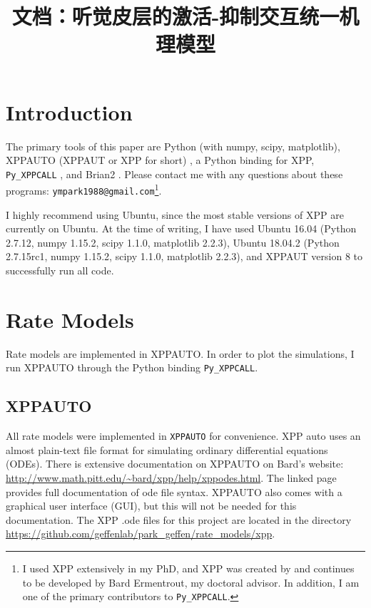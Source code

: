 \documentclass[a4paper,10pt]{article}
\title{文档：听觉皮层的激活-抑制交互统一机理模型}
\newcommand{\y}[1]{{\texttt{#1}}}
\begin{document}
\maketitle



\section{Introduction}
The primary tools of this paper are Python (with numpy, scipy, matplotlib), XPPAUTO (XPPAUT or XPP for short) \cite{ermentrout2002simulating}, a Python binding for XPP, \y{Py\_XPPCALL} \cite{xppy}, and Brian2 \cite{Stimberg595710}. Please contact me with any questions about these programs: \y{ympark1988@gmail.com}\footnote{I used XPP extensively in my PhD, and XPP was created by and continues to be developed by Bard Ermentrout, my doctoral advisor. In addition, I am one of the primary contributors to \y{Py\_XPPCALL}.}.

I highly recommend using Ubuntu, since the most stable versions of XPP are currently on Ubuntu. At the time of writing, I have used Ubuntu 16.04 (Python 2.7.12, numpy 1.15.2, scipy 1.1.0, matplotlib 2.2.3), Ubuntu 18.04.2 (Python 2.7.15rc1, numpy 1.15.2, scipy 1.1.0, matplotlib 2.2.3), and XPPAUT version 8 to successfully run all code.

\section{Rate Models}

Rate models are implemented in XPPAUTO. In order to plot the simulations, I run XPPAUTO through the Python binding \y{Py\_XPPCALL}. 

\subsection{XPPAUTO}
All rate models were implemented in \texttt{XPPAUTO} for convenience. XPP auto uses an almost plain-text file format for simulating ordinary differential equations (ODEs). There is extensive documentation on XPPAUTO on Bard's website:
\url{http://www.math.pitt.edu/~bard/xpp/help/xppodes.html}. The linked page provides full documentation of ode file syntax. XPPAUTO also comes with a graphical user interface (GUI), but this will not be needed for this documentation. The XPP .ode files for this project are located in the directory \url{https://github.com/geffenlab/park_geffen/rate_models/xpp}.
\end{document}
